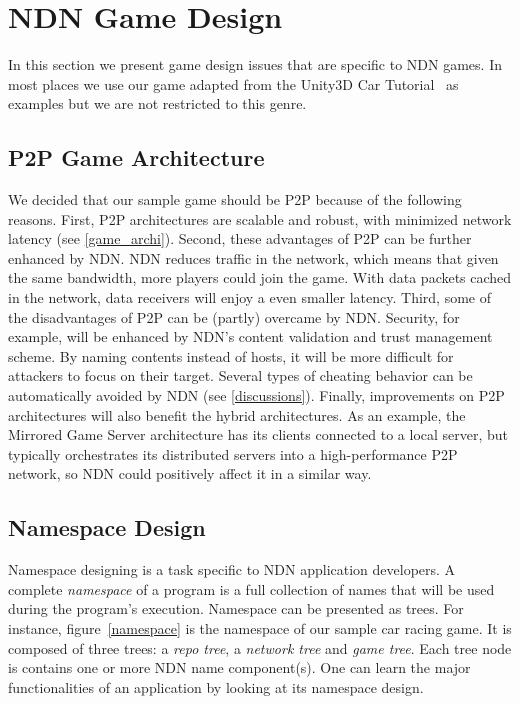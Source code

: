 \chapter{NDN Game Design}

\label{gamedesign}


In this section we present game design issues that are specific to NDN games. In most places we use our game adapted from the Unity3D Car Tutorial~\cite{UnityCar} as examples but we are not restricted to this genre.


\section{P2P Game Architecture}

We decided that our sample game should be P2P because of the following reasons. First, P2P architectures are scalable and robust, with minimized network latency (see \ref{game_archi}). Second, these advantages of P2P can be further enhanced by NDN. NDN reduces traffic in the network, which means that given the same bandwidth, more players could join the game. With data packets cached in the network, data receivers will enjoy a even smaller latency. Third, some of the disadvantages of P2P can be (partly) overcame by NDN. Security, for example, will be enhanced by NDN's content validation and trust management scheme. By naming contents instead of hosts, it will be more difficult for attackers to focus on their target. Several types of cheating behavior can be automatically avoided by NDN (see \ref{discussions}). Finally, improvements on P2P architectures will also benefit the hybrid architectures. As an example, the Mirrored Game Server architecture has its clients connected to a local server, but typically orchestrates its distributed servers into a high-performance P2P network, so NDN could positively affect it in a similar way.


\section{Namespace Design}

Namespace designing is a task specific to NDN application developers. A complete \emph{namespace} of a program is a full collection of names that will be used during the program's execution. Namespace can be presented as trees. For instance, figure~\ref{namespace} is the namespace of our sample car racing game. It is composed of three trees: a \emph{repo tree}, a \emph{network tree} and \emph{game tree}. Each tree node is contains one or more NDN name component(s). One can learn the major functionalities of an application by looking at its namespace design.


